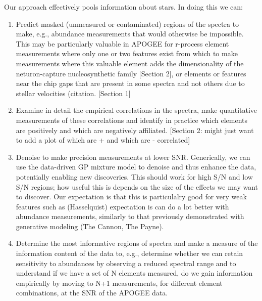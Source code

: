 \documentclass[a4paper,fleqn,usenatbib]{mnras}
\begin{document}
Our approach effectively pools information about stars. In doing this we can: 
\begin{enumerate}
\item Predict masked (unmeasured or contaminated) regions of the spectra to make, e.g., abundance measurements that would otherwise be impossible. This may be particularly valuable in APOGEE for r-process element measurements where only one or two features exist from which to make measurements where this valuable element adds the dimensionality of the neturon-capture nucleosynthetic family [Section 2], or elements or features near the chip gaps that are present in some spectra and not others due to stellar velocities (citation. [Section 1] 
\item Examine in detail the empirical correlations in the spectra, make quantitative measurements of these correlations and identify in practice which elements are positively and which are negatively affiliated. [Section 2: might just want to add a plot of which are + and which are - correlated] 
\item Denoise to make precision measurements at lower SNR.  Generically, we can use the data-driven GP mixture model to denoise and thus enhance the data, potentially enabling new discoveries. This should work for high S/N and low S/N regions; how useful this is depends on the size of the effects we may want to discover. Our expectation is that this is particulalry good for very weak features such as (Hasselquist) expectation is can do a lot better with abundance measurements, similarly to that previously demonstrated with generative modeling (The Cannon, The Payne). 
\item Determine the most informative regions of spectra and make a measure of the information content of the data to, e.g., determine whether we can retain sensitivity to abundances by observing a reduced spectral range and to understand if we have a set of N elements measured, do we gain information empirically by moving to N+1 measurements, for different element combinations, at the SNR of the APOGEE data. 
\end{enumerate}


\end{document}
